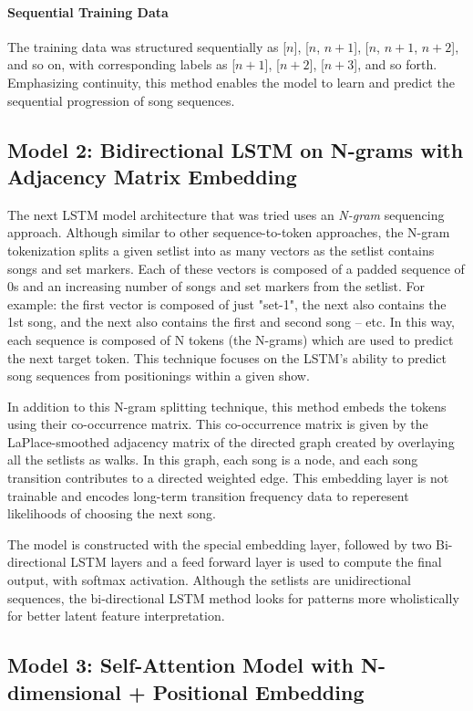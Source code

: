 \documentclass{article}
\begin{document}
\paragraph{Sequential Training Data}
The training data was structured sequentially as [$n$], [$n$, $n+1$], [$n$, $n+1$, $n+2$], and so on, with corresponding labels as [$n+1$], [$n+2$], [$n+3$], and so forth. Emphasizing continuity, this method enables the model to learn and predict the sequential progression of song sequences. 

\subsection{Model 2: Bidirectional LSTM on N-grams with Adjacency Matrix Embedding}

The next LSTM model architecture that was tried uses an {\it N-gram} sequencing approach. Although similar to other sequence-to-token approaches, the N-gram tokenization splits a given setlist into as many vectors as the setlist contains songs and set markers. Each of these vectors is composed of a padded sequence of 0s and an increasing number of songs and set markers from the setlist. For example: the first vector is composed of just "set-1", the next also contains the 1st song, and the next also contains the first and second song – etc. In this way, each sequence is composed of N tokens (the N-grams) which are used to predict the next target token. This technique focuses on the LSTM's ability to predict song sequences from positionings within a given show. 

In addition to this N-gram splitting technique, this method embeds the tokens using their co-occurrence matrix. This co-occurrence matrix is given by the LaPlace-smoothed adjacency matrix of the directed graph created by overlaying all the setlists as walks. In this graph, each song is a node, and each song transition contributes to a directed weighted edge. This embedding layer is not trainable and encodes long-term transition frequency data to reperesent likelihoods of choosing the next song. 

The model is constructed with the special embedding layer, followed by two Bi-directional LSTM layers and a feed forward layer is used to compute the final output, with softmax activation. Although the setlists are unidirectional sequences, the bi-directional LSTM method looks for patterns more wholistically for better latent feature interpretation. 

\subsection{Model 3: Self-Attention Model with N-dimensional + Positional Embedding}
\end{document}
